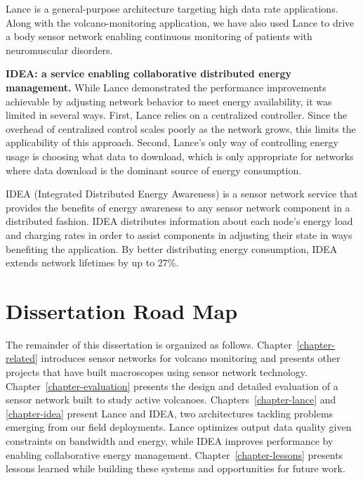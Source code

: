 Lance is a general-purpose architecture targeting high data rate
applications. Along with the volcano-monitoring application, we have also
used Lance to drive a body sensor network enabling continuous monitoring of
patients with neuromuscular disorders.

\clearpage

\noindent \textbf{IDEA: a service enabling collaborative distributed energy
management.} While Lance demonstrated the performance improvements achievable
by adjusting network behavior to meet energy availability, it was limited in
several ways. First, Lance relies on a centralized controller. Since the
overhead of centralized control scales poorly as the network grows, this
limits the applicability of this approach. Second, Lance's only way of
controlling energy usage is choosing what data to download, which is only
appropriate for networks where data download is the dominant source of energy
consumption.

IDEA (Integrated Distributed Energy Awareness) is a sensor network service
that provides the benefits of energy awareness to any sensor network
component in a distributed fashion. IDEA distributes information about each
node's energy load and charging rates in order to assist components in
adjusting their state in ways benefiting the application. By better
distributing energy consumption, IDEA extends network lifetimes by up to
27\%.

\section{Dissertation Road Map}

The remainder of this dissertation is organized as follows.
Chapter~\ref{chapter-related} introduces sensor networks for volcano
monitoring and presents other projects that have built macroscopes using
sensor network technology. Chapter~\ref{chapter-evaluation} presents the
design and detailed evaluation of a sensor network built to study active
volcanoes. Chapters~\ref{chapter-lance} and \ref{chapter-idea} present Lance
and IDEA, two architectures tackling problems emerging from our field
deployments. Lance optimizes output data quality given constraints on
bandwidth and energy, while IDEA improves performance by enabling
collaborative energy management. Chapter~\ref{chapter-lessons} presents
lessons learned while building these systems and opportunities for future
work.
